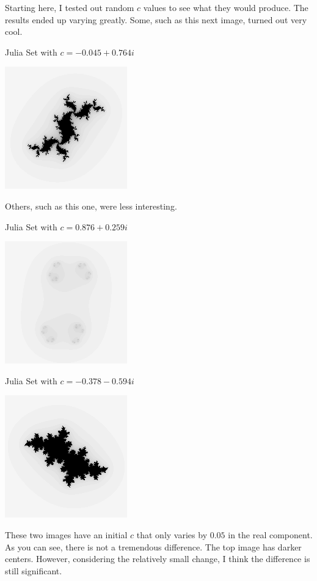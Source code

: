 \documentclass{article}
\begin{document}
\begin{center}
\bigskip
Starting here, I tested out random $c$ values to see what they would produce.  The results ended up varying greatly.  Some, such as this next image, turned out very cool.

\bigskip
Julia Set with $c = -0.045 + 0.764i$

\includegraphics{Julia4}

\clearpage
Others, such as this one, were less interesting.
\bigskip

Julia Set with $c = 0.876 + 0.259i$

\includegraphics{Julia5}

Julia Set with $c = -0.378 - 0.594i$

\includegraphics{Julia6}

\clearpage
These two images have an initial $c$ that only varies by $0.05$ in the real component.  As you can see, there is not a tremendous difference.  The top image has darker centers.  However, considering the relatively small change, I think the difference is still significant. 


\end{center}
\end{document}
